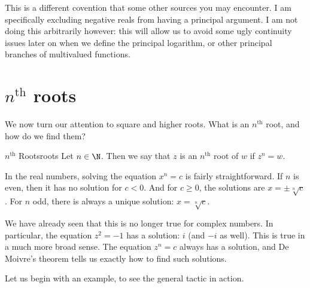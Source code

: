 \begin{note} This is a different covention that some other sources you may encounter. I am specifically excluding negative reals from having a principal argument. I am not doing this arbitrarily however: this will allow us to avoid some ugly continuity issues later on when we define the principal logarithm, or other principal branches of multivalued functions.\end{note}


\section{$n^{\text{th}}$ roots}

We now turn our attention to square and higher roots. What is an $n^{\text{th}}$ root, and how do we find them?

\begin{defbo}{$n^{\text{th}}$ Roots}{roots}
Let $n\in\N$. Then we say that $z$ is an $n^{\text{th}}$ root of $w$ if $z^n = w$.
\end{defbo}

In the real numbers, solving the equation $x^n = c$ is fairly straightforward. If $n$ is even, then it has no solution for $c < 0$. And for $c \ge 0$, the solutions are $x = \pm\sqrt[n]{c}$. For $n$ odd, there is always a unique solution: $x = \sqrt[n]{c}$.

We have already seen that this is no longer true for complex numbers. In particular, the equation $z^2 = -1$ has a solution: $i$ (and $-i$ as well). This is true in a much more broad sense. The equation $z^n = c$ always has a solution, and De Moivre's theorem tells us exactly how to find such solutions.

Let us begin with an example, to see the general tactic in action.

